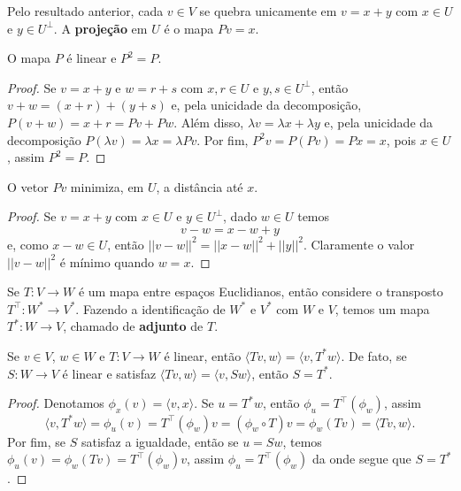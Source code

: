 Pelo resultado anterior, cada $v \in V$ se quebra unicamente em $v = x + y$ com $x \in U$ e $y \in U^\perp$. A \textbf{projeção} em $U$ é o mapa $Pv = x$.

\begin{proposition}
    O mapa $P$ é linear e $P^2 = P$.
\end{proposition}
\begin{proof}
    Se $v = x + y$ e $w = r + s$ com $x, r \in U$ e $y, s \in U^\perp$, então $v + w = (x + r) + (y + s)$ e, pela unicidade da decomposição, $P(v + w) = x + r = Pv + Pw$. Além disso, $\lambda v = \lambda x + \lambda y$ e, pela unicidade da decomposição $P(\lambda v) = \lambda x = \lambda Pv$. Por fim, $P^2v = P(Pv) = Px = x$, pois $x \in U$, assim $P^2 = P$.
\end{proof}

\begin{theorem}
    O vetor $Pv$ minimiza, em $U$, a distância até $x$.
\end{theorem}
\begin{proof}
    Se $v = x + y$ com $x \in U$ e $y \in U^\perp$, dado $w \in U$ temos \begin{equation}
        v - w = x - w + y
    \end{equation} e, como $x - w \in U$, então $||v - w||^2 = ||x - w||^2 + ||y||^2$. Claramente o valor $||v - w||^2$ é mínimo quando $w = x$.
\end{proof}

Se $T \colon V \to W$ é um mapa entre espaços Euclidianos, então considere o transposto $T^\top \colon W^* \to V^*$. Fazendo a identificação de $W^*$ e $V^*$ com $W$ e $V$, temos um mapa $T^* \colon W \to V$, chamado de \textbf{adjunto} de $T$.

\begin{proposition}
    Se $v \in V$, $w \in W$ e $T \colon V \to W$ é linear, então $\langle Tv, w \rangle = \langle v, T^*w \rangle$. De fato, se $S \colon W \to V$ é linear e satisfaz $\langle Tv, w \rangle = \langle v, Sw \rangle$, então $S = T^*$.
\end{proposition}
\begin{proof}
    Denotamos $\phi_x(v) = \langle v, x \rangle$. Se $u = T^*w$, então $\phi_u = T^\top(\phi_w)$, assim \begin{equation}
        \langle v, T^*w \rangle = \phi_u(v) = T^\top(\phi_w)v = (\phi_w \circ T)v = \phi_w(Tv) = \langle Tv, w \rangle.
    \end{equation}
    Por fim, se $S$ satisfaz a igualdade, então se $u = Sw$, temos $\phi_u(v) = \phi_w(Tv) = T^\top(\phi_w)v$, assim $\phi_u = T^\top(\phi_w)$ da onde segue que $S = T^*$.
\end{proof}

